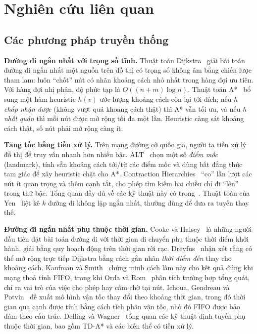 \section{Nghiên cứu liên quan}\label{sec:related}

\subsection{Các phương pháp truyền thống}\label{sec:related:classic}

\textbf{Đường đi ngắn nhất với trọng số tĩnh.} Thuật toán Dijkstra~\cite{dijkstra1959} giải bài toán đường đi ngắn nhất
một nguồn trên đồ thị có trọng số không âm bằng chiến lược tham lam: luôn ``chốt'' nút có nhãn khoảng cách nhỏ nhất
trong hàng đợi ưu tiên. Với hàng đợi nhị phân, độ phức tạp là $O((n+m)\log n)$. Thuật toán A*~\cite{hart1968} bổ sung một
hàm heuristic $h(v)$ ước lượng khoảng cách còn lại tới đích; nếu $h$ \emph{chấp nhận được} (không vượt quá khoảng cách
thật) thì A* vẫn tối ưu, và nếu $h$ \emph{nhất quán} thì mỗi nút được mở rộng tối đa một lần. Heuristic càng sát khoảng
cách thật, số nút phải mở rộng càng ít.

\textbf{Tăng tốc bằng tiền xử lý.} Trên mạng đường cỡ quốc gia, người ta tiền xử lý đồ thị để truy vấn nhanh hơn nhiều
bậc. ALT~\cite{goldberg2005alt} chọn một số \emph{điểm mốc} (landmark), tính sẵn khoảng cách tới/từ các điểm mốc và dùng
bất đẳng thức tam giác để xây heuristic chặt cho A*. Contraction Hierarchies~\cite{geisberger2008ch} ``co'' lần lượt các
nút ít quan trọng và thêm cạnh tắt, cho phép tìm kiếm hai chiều chỉ đi ``lên'' trong thứ bậc. Tổng quan đầy đủ về các
kỹ thuật này có trong~\cite{bast2016}. Thuật toán của Yen~\cite{yen1971} liệt kê $k$ đường đi không lặp ngắn nhất, thường
dùng để đưa ra tuyến thay thế.

\textbf{Đường đi ngắn nhất phụ thuộc thời gian.} Cooke và Halsey~\cite{cooke1966} là những người đầu tiên đặt bài toán
đường đi với thời gian di chuyển phụ thuộc thời điểm khởi hành, giải bằng quy hoạch động trên thời gian rời rạc.
Dreyfus~\cite{dreyfus1969} nhận xét rằng có thể mở rộng trực tiếp Dijkstra bằng cách gắn nhãn \emph{thời điểm đến} thay
cho khoảng cách. Kaufman và Smith~\cite{kaufman1993} chứng minh cách làm này cho kết quả đúng khi mạng thoả tính FIFO,
trong khi Orda và Rom~\cite{orda1990} phân tích trường hợp tổng quát, chỉ ra vai trò của việc cho phép hay cấm chờ tại
nút. Ichoua, Gendreau và Potvin~\cite{ichoua2003} đề xuất mô hình vận tốc thay đổi theo khoảng thời gian, trong đó thời
gian qua cạnh được tính bằng cách tích phân vận tốc, nhờ đó FIFO được bảo đảm theo cấu trúc. Delling và
Wagner~\cite{delling2009} tổng quan các kỹ thuật định tuyến phụ thuộc thời gian, bao gồm TD-A* và các biến thể có tiền xử lý.


